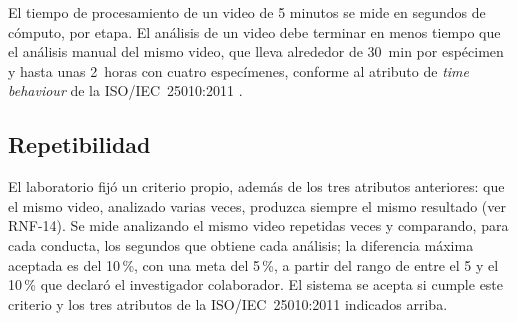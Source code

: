 El tiempo de procesamiento de un video de 5 minutos se mide en segundos de cómputo, por etapa. El análisis de un video
debe terminar en menos tiempo que el análisis manual del mismo video, que lleva alrededor de 30~min por espécimen y
hasta unas 2~horas con cuatro especímenes, conforme al atributo de \textit{time behaviour} de la ISO/IEC~25010:2011
\cite{iso25010}.

\subsection{Repetibilidad}

El laboratorio fijó un criterio propio, además de los tres atributos anteriores: que
el mismo video, analizado varias veces, produzca siempre el mismo resultado
(ver RNF-14). Se mide analizando el mismo video repetidas veces y comparando, para cada
conducta, los segundos que obtiene cada análisis; la diferencia máxima aceptada es del
10\,\%, con una meta del 5\,\%, a partir del rango de entre el 5 y el 10\,\% que declaró el investigador colaborador. El sistema se acepta si cumple este criterio
y los tres atributos de la ISO/IEC~25010:2011 indicados arriba.
